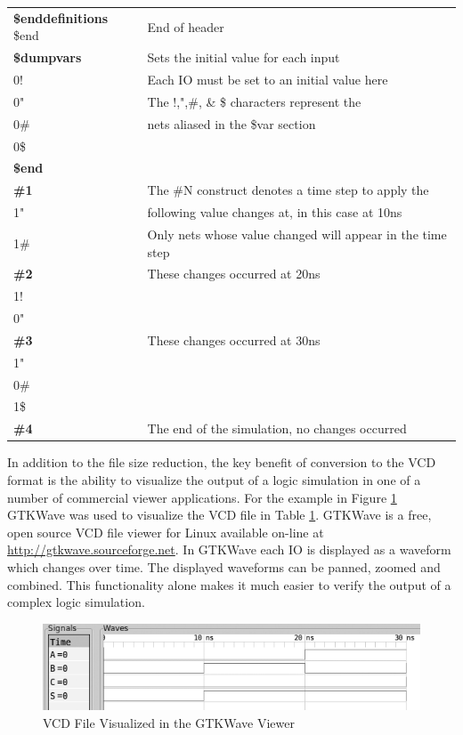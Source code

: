 \documentclass[12pt]{report}
\begin{document}
\begin{table}
\begin{center}
\begin{tabular}{l|l}
			\textbf{\$enddefinitions} \$end & End of header \\
			\textbf{\$dumpvars} & Sets the initial value for each input \\
			0!	& Each IO must be set to an initial value here \\
			0"	& The !,",\#, \& \$ characters represent the\\
			0\# & nets aliased in the \$var section\\
			0\$ & \\
			\textbf{\$end} & \\
			\textbf{\#1} & The \#N construct denotes a time step to apply the \\
			1" & following value changes at, in this case at 10ns \\
			1\# & Only nets whose value changed will appear in the time step\\
			\textbf{\#2} & These changes occurred at 20ns \\ 
			1! & \\
			0" & \\
			\textbf{\#3} & These changes occurred at 30ns\\
			1" & \\
			0\# & \\
			1\$ & \\	
			\textbf{\#4} & The end of the simulation, no changes occurred \\		
		\end{tabular}
    \label{tbl:half_adder_vcd}
	\end{center}
\end{table} 
In addition to the file size reduction, the key benefit of conversion to the VCD format is the ability to visualize the output of a logic simulation in one of a number of commercial viewer applications.  For the example in Figure \ref{fig:half-adder-gtkwave} GTKWave was used to visualize the VCD file in Table \ref{tbl:half_adder_vcd}.  GTKWave is a free, open source VCD file viewer for Linux available on-line at \url{http://gtkwave.sourceforge.net}.  In GTKWave each IO is displayed as a waveform which changes over time.  The displayed waveforms can be panned, zoomed and combined.  This functionality alone makes it much easier to verify the output of a complex logic simulation.  
\begin{figure}
	\begin{center}
		\includegraphics[scale=.8]{images/half-adder-vcd}
	\end{center}
	\caption{VCD File Visualized in the GTKWave Viewer}
	\label{fig:half-adder-gtkwave}
\end{figure}
\end{document}
